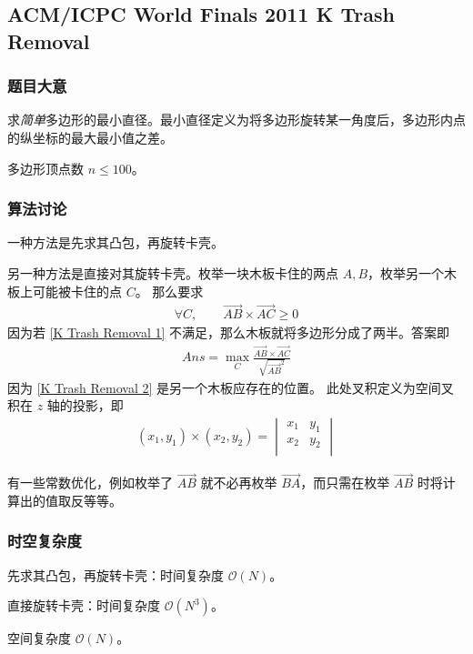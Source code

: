 		\subsection{ACM/ICPC World Finals 2011 K Trash Removal}
			\subsubsection{题目大意}
				求\emph{简单}多边形的最小直径。最小直径定义为将多边形旋转某一角度后，多边形内点的纵坐标的最大最小值之差。
				
				多边形顶点数 $n \le \num{100}$。
			\subsubsection{算法讨论}
				一种方法是先求其凸包，再旋转卡壳。
				
				另一种方法是直接对其旋转卡壳。枚举一块木板卡住的两点 $A, B$，枚举另一个木板上可能被卡住的点 $C$。
				那么要求
				\begin{align}
					\forall C, \quad \quad \overrightarrow{AB} \times \overrightarrow{AC} \ge 0 \label{K Trash Removal 1}
				\end{align}
				因为若 \eqref{K Trash Removal 1} 不满足，那么木板就将多边形分成了两半。答案即
				\begin{align}
					Ans = \max_C \frac{ \overrightarrow{AB} \times \overrightarrow{AC}}{ \sqrt{ {\overrightarrow{AB}}^2 }} \label{K Trash Removal 2}
				\end{align}
				因为 \eqref{K Trash Removal 2}  是另一个木板应存在的位置。
				此处叉积定义为空间叉积在 $z$ 轴的投影，即
				\begin{align}
					(x_1, y_1) \times(x_2, y_2) = \begin{vmatrix} x_1 & y_1 \\ x_2 & y_2 \\\end{vmatrix}
				\end{align}
				
				有一些常数优化，例如枚举了 $\overrightarrow{AB}$ 就不必再枚举 $\overrightarrow{BA}$，而只需在枚举 $\overrightarrow{AB}$ 时将计算出的值取反等等。
			\subsubsection{时空复杂度}
				先求其凸包，再旋转卡壳：时间复杂度  $\mathcal{O}\left(N\right)$。
				
				直接旋转卡壳：时间复杂度  $\mathcal{O}\left(N^3\right)$。
				
				空间复杂度 $\mathcal{O}\left(N\right)$。
				
				
		\newpage
				